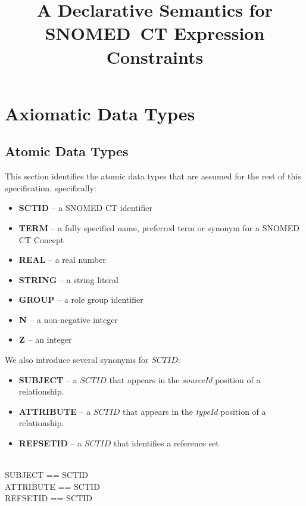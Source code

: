 \documentclass{article}
\title{A Declarative Semantics for SNOMED~CT Expression Constraints}
\begin{document}
\maketitle
\tableofcontents

\section{Axiomatic Data Types}
\subsection{Atomic Data Types}
This section identifies the atomic data types that are assumed for the rest of this specification, specifically:
\begin{itemize}[noitemsep]
\item \textbf{SCTID} -- a SNOMED CT identifier
\item \textbf{TERM} --  a  fully specified name, preferred term or synonym for a SNOMED CT Concept
\item \textbf{REAL} --  a real number
\item \textbf{STRING} -- a string literal
\item \textbf{GROUP} -- a role group identifier
\item \textbf{${\mathbf{N}}$} -- a non-negative integer
\item \textbf{${\mathbf{Z}}$} -- an integer
\end{itemize}


We also introduce several synonyms for $SCTID$:
\begin{itemize}[noitemsep]
\item \textbf{SUBJECT} -- a $SCTID$ that appears in the \emph{sourceId} position of a relationship.
\item \textbf{ATTRIBUTE} -- a $SCTID$ that appears in the \emph{typeId} position of a relationship.
\item \textbf{REFSETID} -- a $SCTID$ that identifies a reference set
\end{itemize}

\begin{zed}
 \\
\also
SUBJECT == SCTID \\
ATTRIBUTE == SCTID \\
REFSETID == SCTID 
\end{zed}
\end{document}
